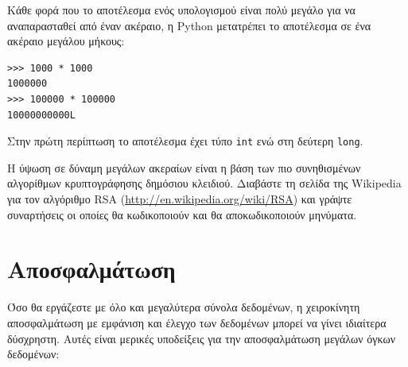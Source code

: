 \documentclass[10pt]{book}
\begin{document}
Κάθε φορά που το αποτέλεσμα ενός υπολογισμού είναι πολύ μεγάλο για να αναπαρασταθεί από έναν ακέραιο, η  Python  μετατρέπει το αποτέλεσμα σε ένα ακέραιο μεγάλου μήκους:

\begin{verbatim}
>>> 1000 * 1000
1000000
>>> 100000 * 100000
10000000000L
\end{verbatim}
%
Στην πρώτη περίπτωση το αποτέλεσμα έχει τύπο {\tt int} ενώ στη δεύτερη {\tt long}.
\\
\begin{exercise}

Η ύψωση σε δύναμη μεγάλων ακεραίων είναι η βάση των πιο συνηθισμένων αλγορίθμων κρυπτογράφησης δημόσιου κλειδιού. Διαβάστε τη σελίδα της  Wikipedia  για τον αλγόριθμο RSA (\url{http://en.wikipedia.org/wiki/RSA}) και γράψτε συναρτήσεις οι οποίες θα κωδικοποιούν και θα αποκωδικοποιούν μηνύματα.
\end{exercise}



\section{Αποσφαλμάτωση}

Όσο θα εργάζεστε με όλο και μεγαλύτερα σύνολα δεδομένων, η χειροκίνητη αποσφαλμάτωση με εμφάνιση και έλεγχο των δεδομένων μπορεί να γίνει ιδιαίτερα δύσχρηστη. Αυτές είναι μερικές υποδείξεις για την αποσφαλμάτωση μεγάλων όγκων δεδομένων:
\end{document}
